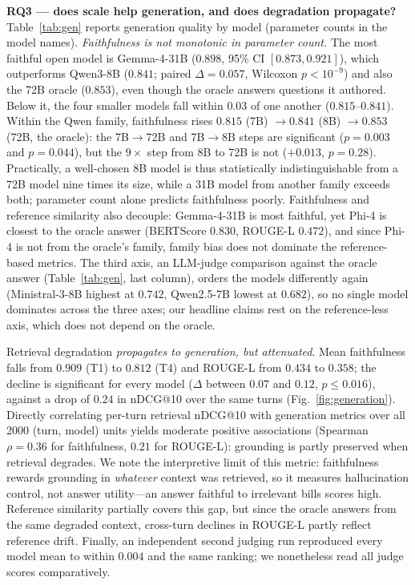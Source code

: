 \documentclass[conference]{IEEEtran}
\begin{document}


\textbf{RQ3 --- does scale help generation, and does degradation propagate?}
Table~\ref{tab:gen} reports generation quality by model (parameter counts in the model names).
\emph{Faithfulness is not monotonic in parameter count.} The most faithful open
model is Gemma-4-31B ($0.898$, 95\% CI $[0.873, 0.921]$), which outperforms
Qwen3-8B ($0.841$; paired $\Delta{=}0.057$, Wilcoxon $p<10^{-9}$) and also the
72B oracle ($0.853$), even though the oracle answers questions it authored. Below
it, the four smaller models fall within $0.03$ of one another ($0.815$--$0.841$).
Within the Qwen family, faithfulness rises $0.815$ (7B) $\to 0.841$ (8B) $\to
0.853$ (72B, the oracle): the 7B$\to$72B and 7B$\to$8B steps are significant
($p{=}0.003$ and $p{=}0.044$), but the $9\times$ step from 8B to 72B is not
($+0.013$, $p{=}0.28$). Practically, a well-chosen 8B model is thus statistically
indistinguishable from a 72B model nine times its size, while a 31B model from
another family exceeds both; parameter count alone predicts faithfulness poorly.
Faithfulness and reference similarity also decouple: Gemma-4-31B is most faithful,
yet Phi-4 is closest to the oracle answer (BERTScore $0.830$, ROUGE-L $0.472$), and
since Phi-4 is not from the oracle's family, family bias does not dominate the
reference-based metrics. The third axis, an LLM-judge comparison against the
oracle answer (Table~\ref{tab:gen}, last column), orders the models differently
again (Ministral-3-8B highest at $0.742$, Qwen2.5-7B lowest at $0.682$), so no
single model dominates across the three axes; our headline claims rest on the
reference-less axis, which does not depend on the oracle.

Retrieval degradation \emph{propagates to generation, but attenuated}. Mean
faithfulness falls from $0.909$ (T1) to $0.812$ (T4) and ROUGE-L from $0.434$ to
$0.358$; the decline is significant for every model ($\Delta$ between $0.07$ and
$0.12$, $p\le0.016$), against a drop of $0.24$ in nDCG@10 over the same turns
(Fig.~\ref{fig:generation}). Directly correlating per-turn retrieval nDCG@10 with
generation metrics over all 2000 (turn, model) units yields moderate positive
associations (Spearman $\rho{=}0.36$ for faithfulness, $0.21$ for ROUGE-L):
grounding is partly preserved when retrieval degrades. We note the interpretive
limit of this metric: faithfulness rewards grounding in \emph{whatever} context
was retrieved, so it measures hallucination control, not answer utility---an
answer faithful to irrelevant bills scores high. Reference similarity partially
covers this gap, but since the oracle answers from the same degraded context,
cross-turn declines in ROUGE-L partly reflect reference drift. Finally, an
independent second judging run reproduced every model mean to within $0.004$ and
the same ranking; we nonetheless read all judge scores comparatively.
\end{document}
